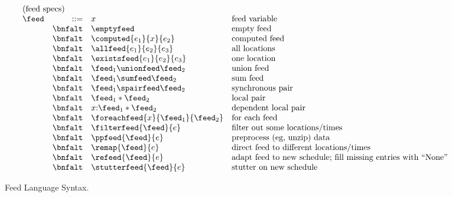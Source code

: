 \begin{figure*}[t]
\[
\begin{array}{lrll}
\multicolumn{4}{l}{\mbox{(feed specs)}}\\ 
\feed & ::=     & x &  \mbox{feed variable} \\
 & \bnfalt & \emptyfeed & \mbox{empty feed} \\
 & \bnfalt & \computed{e_1}{x}{e_2} & \mbox{computed feed} \\
 & \bnfalt & \allfeed{e_1}{e_2}{e_3} & \mbox{all locations} \\
 & \bnfalt & \existsfeed{e_1}{e_2}{e_3} & \mbox{one location} \\
 & \bnfalt & \feed_1 \unionfeed \feed_2 & \mbox{union feed} \\
 & \bnfalt & \feed_1 \sumfeed \feed_2 & \mbox{sum feed} \\
 & \bnfalt & \feed_1 \spairfeed \feed_2 & \mbox{synchronous pair} \\
 & \bnfalt & \feed_1 * \feed_2 & \mbox{local pair} \\
 & \bnfalt & x{:}\feed_1 * \feed_2 & \mbox{dependent local pair} \\
 & \bnfalt & \foreachfeed{x}{\feed_1}{\feed_2} & \mbox{for each feed} \\
 & \bnfalt & \filterfeed{\feed}{e} & \mbox{filter out some locations/times} \\
 & \bnfalt & \ppfeed{\feed}{e} & \mbox{preprocess (eg, unzip) data} \\
 & \bnfalt & \remap{\feed}{e} & \mbox{direct feed to different locations/times} \\
 & \bnfalt & \refeed{\feed}{e} & \mbox{adapt feed to new schedule; 
                                               fill missing entries with ``None''} \\
 & \bnfalt & \stutterfeed{\feed}{e} & \mbox{stutter on new schedule} \\

\end{array}
\]
\caption{Feed Language Syntax.}
\label{fig:syntax}
\end{figure*}


